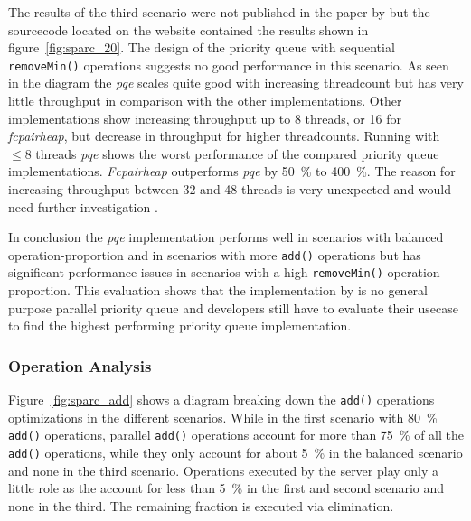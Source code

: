 The results of the third scenario were not published in the paper by \citeauthor{calciu_adaptive_2014} but the sourcecode located on the  website contained the results shown in figure~\ref{fig:sparc_20}. The design of the priority queue with sequential \texttt{removeMin()} operations suggests no good performance in this scenario. As seen in the diagram the \textit{pqe} scales quite good with increasing threadcount but has very little throughput in comparison with the other implementations. Other implementations show increasing throughput up to 8 threads, or 16 for \textit{fcpairheap}, but decrease in throughput for higher threadcounts.  Running with $\le 8$ threads \textit{pqe} shows the worst performance of the compared priority queue implementations. \textit{Fcpairheap} outperforms \textit{pqe} by 50~\% to 400~\%. The reason for increasing throughput between 32 and 48 threads is very unexpected and would need further investigation \cite{calciu_adaptive_2014-1}.

In conclusion the \textit{pqe} implementation performs well in scenarios with balanced operation-proportion and in scenarios with more \texttt{add()} operations but has significant performance issues in scenarios with a high \texttt{removeMin()} operation-proportion. This evaluation shows that the implementation by \citeauthor{calciu_adaptive_2014} is no general purpose parallel priority queue and developers still have to evaluate their usecase to find the highest performing priority queue implementation.

\subsubsection{Operation Analysis}

Figure~\ref{fig:sparc_add} shows a diagram breaking down the \texttt{add()} operations optimizations in the different scenarios. While in the first scenario with 80~\% \texttt{add()} operations, parallel \texttt{add()} operations account for more than 75~\% of all the \texttt{add()} operations, while they only account for about 5~\% in the balanced scenario and none in the third scenario. Operations executed by the server play only a little role as the account for less than 5~\% in the first and second scenario and none in the third. The remaining fraction is executed via elimination.

